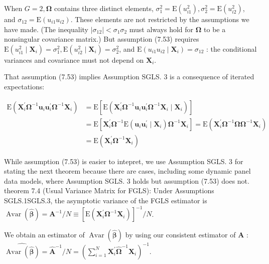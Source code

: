 \documentclass[10pt]{article}
\begin{document}
When $G=2, \boldsymbol{\Omega}$ contains three distinct elements, $\sigma_{1}^{2}=\mathrm{E}\left(u_{i 1}^{2}\right), \sigma_{2}^{2}=\mathrm{E}\left(u_{i 2}^{2}\right)$, and $\sigma_{12}=\mathrm{E}\left(u_{i 1} u_{i 2}\right)$. These elements are not restricted by the assumptions we have made. (The inequality $\left|\sigma_{12}\right|<\sigma_{1} \sigma_{2}$ must always hold for $\boldsymbol{\Omega}$ to be a nonsingular covariance matrix.) But assumption (7.53) requires $\mathrm{E}\left(u_{i 1}^{2} \mid \mathbf{X}_{i}\right)=\sigma_{1}^{2}, \mathrm{E}\left(u_{i 2}^{2} \mid \mathbf{X}_{i}\right)=\sigma_{2}^{2}$, and $\mathrm{E}\left(u_{i 1} u_{i 2} \mid \mathbf{X}_{i}\right)=\sigma_{12}$ : the conditional variances and covariance must not depend on $\mathbf{X}_{i}$.

That assumption (7.53) implies Assumption SGLS. 3 is a consequence of iterated expectations:

$$
\begin{aligned}
\mathrm{E}\left(\mathbf{X}_{i}^{\prime} \boldsymbol{\Omega}^{-1} \mathbf{u}_{i} \mathbf{u}_{i}^{\prime} \boldsymbol{\Omega}^{-1} \mathbf{X}_{i}\right) & =\mathrm{E}\left[\mathrm{E}\left(\mathbf{X}_{i}^{\prime} \boldsymbol{\Omega}^{-1} \mathbf{u}_{i} \mathbf{u}_{i}^{\prime} \boldsymbol{\Omega}^{-1} \mathbf{X}_{i} \mid \mathbf{X}_{i}\right)\right] \\
& =\mathrm{E}\left[\mathbf{X}_{i}^{\prime} \boldsymbol{\Omega}^{-1} \mathrm{E}\left(\mathbf{u}_{i} \mathbf{u}_{i}^{\prime} \mid \mathbf{X}_{i}\right) \boldsymbol{\Omega}^{-1} \mathbf{X}_{i}\right]=\mathrm{E}\left(\mathbf{X}_{i}^{\prime} \boldsymbol{\Omega}^{-1} \boldsymbol{\Omega} \boldsymbol{\Omega}^{-1} \mathbf{X}_{i}\right) \\
& =\mathrm{E}\left(\mathbf{X}_{i}^{\prime} \boldsymbol{\Omega}^{-1} \mathbf{X}_{i}\right)
\end{aligned}
$$

While assumption (7.53) is easier to intepret, we use Assumption SGLS. 3 for stating the next theorem because there are cases, including some dynamic panel data models, where Assumption SGLS. 3 holds but assumption (7.53) does not.\\
theorem 7.4 (Usual Variance Matrix for FGLS): Under Assumptions SGLS.1SGLS.3, the asymptotic variance of the FGLS estimator is $\operatorname{Avar}(\hat{\boldsymbol{\beta}})=\mathbf{A}^{-1} / N \equiv \left[\mathrm{E}\left(\mathbf{X}_{i}^{\prime} \boldsymbol{\Omega}^{-1} \mathbf{X}_{i}\right)\right]^{-1} / N$.

We obtain an estimator of $\operatorname{Avar}(\hat{\boldsymbol{\beta}})$ by using our consistent estimator of $\mathbf{A}$ :\\
$\widehat{\operatorname{Avar}(\hat{\boldsymbol{\beta}})}=\hat{\mathbf{A}}^{-1} / N=\left(\sum_{i=1}^{N} \mathbf{X}_{i}^{\prime} \hat{\boldsymbol{\Omega}}^{-1} \mathbf{X}_{i}\right)^{-1}$.
\end{document}
